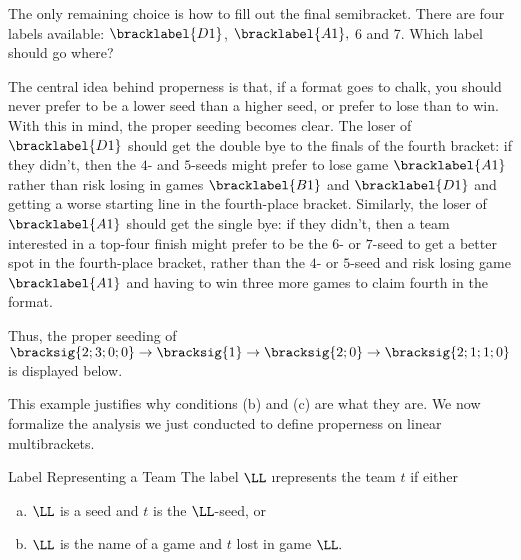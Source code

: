 {    

    The only remaining choice is how to fill out the final semibracket. There are four labels available: $\bracklabel{D1}$, $\bracklabel{A1},$ 6 and 7. Which label should go where?

    The central idea behind properness is that, if a format goes to chalk, you should never prefer to be a lower seed than a higher seed, or prefer to lose than to win. With this in mind, the proper seeding becomes clear. The loser of $\bracklabel{D1}$ should get the double bye to the finals of the fourth bracket: if they didn't, then the $4$- and $5$-seeds might prefer to lose game $\bracklabel{A1}$ rather than risk losing in games $\bracklabel{B1}$ and $\bracklabel{D1}$ and getting a worse starting line in the fourth-place bracket. Similarly, the loser of $\bracklabel{A1}$ should get the single bye: if they didn't, then a team interested in a top-four finish might prefer to be the $6$- or $7$-seed to get a better spot in the fourth-place bracket, rather than the $4$- or $5$-seed and risk losing game $\bracklabel{A1}$ and having to win three more games to claim fourth in the format.

    Thus, the proper seeding of $\bracksig{2;3;0;0} \to \bracksig{1} \to \bracksig{2;0} \to \bracksig{2;1;1;0}$ is displayed below.


    This example justifies why conditions (b) and (c) are what they are. We now formalize the analysis we just conducted to define properness on linear multibrackets.

    \begin{definition}{Label Representing a Team}{}
        The label $\LL$ \i{represents} the team $t$ if either
        \begin{enumerate}[(a)]
            \item $\LL$ is a seed and $t$ is the $\LL$-seed, or
            \item $\LL$ is the name of a game and $t$ lost in game $\LL.$
        \end{enumerate}
    \end{definition}

}
